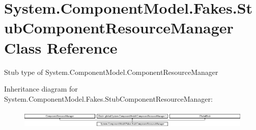 \hypertarget{class_system_1_1_component_model_1_1_fakes_1_1_stub_component_resource_manager}{\section{System.\-Component\-Model.\-Fakes.\-Stub\-Component\-Resource\-Manager Class Reference}
\label{class_system_1_1_component_model_1_1_fakes_1_1_stub_component_resource_manager}
}


Stub type of System.\-Component\-Model.\-Component\-Resource\-Manager 


Inheritance diagram for System.\-Component\-Model.\-Fakes.\-Stub\-Component\-Resource\-Manager\-:\begin{figure}[H]
\begin{center}
\leavevmode
\includegraphics[height=0.880503cm]{class_system_1_1_component_model_1_1_fakes_1_1_stub_component_resource_manager}
\end{center}
\end{figure}
